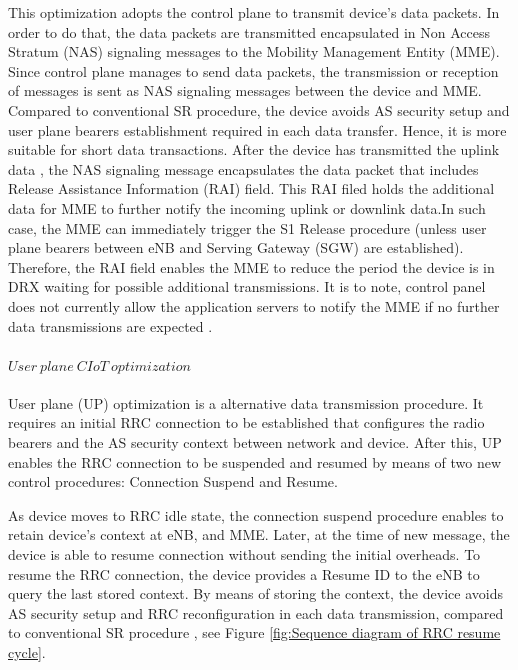\documentclass[12pt]{article}
\begin{document}
This optimization adopts the control plane to transmit device's data packets. In order to do that, the data packets are transmitted encapsulated in Non Access Stratum (NAS) signaling messages to the Mobility Management Entity (MME).
Since control plane manages to send data packets, the transmission or reception of messages is sent as NAS signaling messages between the device and MME. Compared to conventional SR procedure, the device avoids AS security setup and user plane bearers establishment required in each data transfer. Hence, it is more suitable for short data transactions.
After the device has transmitted the uplink data , the NAS signaling message encapsulates the data packet that includes Release Assistance Information (RAI) field. This RAI filed holds the additional data for MME to further notify the incoming uplink or downlink data.In such case, the MME can immediately trigger the S1 Release procedure (unless user plane bearers between eNB and Serving Gateway (SGW) are established). Therefore, the RAI field enables the MME to reduce the period the device is in DRX waiting for possible additional transmissions. It is to note, control panel does not currently allow the application servers to notify the MME if no further data transmissions are expected \cite{andres2017narrowband}.\par

\paragraph{$User\  plane\  CIoT\  optimization$}\par

User plane (UP) optimization is a alternative data transmission procedure. It requires an initial RRC connection to be established that configures the radio bearers and the AS security context between network and device. After this, UP enables the RRC connection to be suspended and resumed by means of two new control procedures: Connection Suspend and Resume.\par
As device moves to RRC idle state, the connection suspend procedure enables to retain device's context at eNB, and MME. Later, at the time of new message, the device is able to resume connection without sending the initial overheads. To resume the RRC connection, the device provides a Resume ID to the eNB to query the last stored context. By means of storing the context, the device avoids AS security setup and RRC reconfiguration in each data transmission, compared to conventional SR procedure \cite{farrell2018low,andres2017narrowband,popli2018survey}, see Figure \ref{fig:Sequence diagram of RRC resume cycle}.
\end{document}
